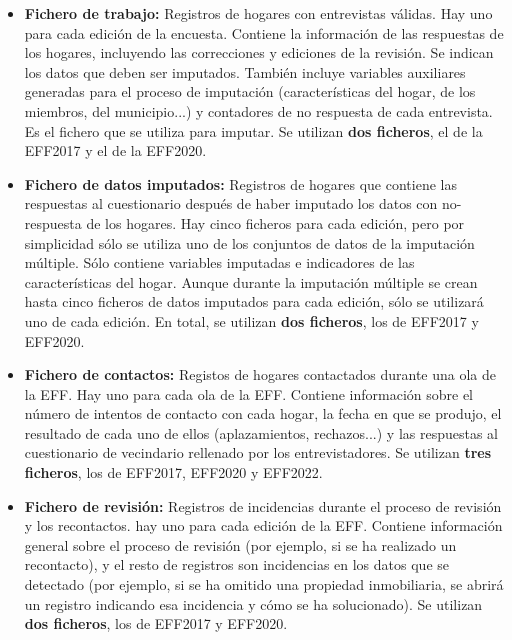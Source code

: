 \begin{itemize}[noitemsep]
    \item \textbf{Fichero de trabajo:} Registros de hogares con entrevistas válidas. Hay uno para cada edición de la encuesta. Contiene la información de las respuestas de los hogares, incluyendo las correcciones y ediciones de la revisión. Se indican los datos que deben ser imputados. También incluye variables auxiliares generadas para el proceso de imputación (características del hogar, de los miembros, del municipio...) y contadores de no respuesta de cada entrevista. Es el fichero que se utiliza para imputar. Se utilizan \textbf{dos ficheros}, el de la EFF2017 y el de la EFF2020.
    \item \textbf{Fichero de datos imputados:} Registros de hogares que contiene las respuestas al cuestionario después de haber imputado los datos con no-respuesta de los hogares. Hay cinco ficheros para cada edición, pero por simplicidad sólo se utiliza uno de los conjuntos de datos de la imputación múltiple. Sólo contiene variables imputadas e indicadores de las características del hogar. Aunque durante la imputación múltiple se crean hasta cinco ficheros de datos imputados para cada edición, sólo se utilizará uno de cada edición. En total, se utilizan \textbf{dos ficheros}, los de EFF2017 y EFF2020.
    \item \textbf{Fichero de contactos:} Registos de hogares contactados durante una ola de la EFF. Hay uno para cada ola de la EFF. Contiene información sobre el número de intentos de contacto con cada hogar, la fecha en que se produjo, el resultado de cada uno de ellos (aplazamientos, rechazos...) y las respuestas al cuestionario de vecindario rellenado por los entrevistadores. Se utilizan \textbf{tres ficheros}, los de EFF2017, EFF2020 y EFF2022.
    \item \textbf{Fichero de revisión:} Registros de incidencias durante el proceso de revisión y los recontactos. hay uno para cada edición de la EFF. Contiene información general sobre el proceso de revisión (por ejemplo, si se ha realizado un recontacto), y el resto de registros son incidencias en los datos que se detectado (por ejemplo, si se ha omitido una propiedad inmobiliaria, se abrirá un registro indicando esa incidencia y cómo se ha solucionado). Se utilizan \textbf{dos ficheros}, los de EFF2017 y EFF2020.

\end{itemize}
